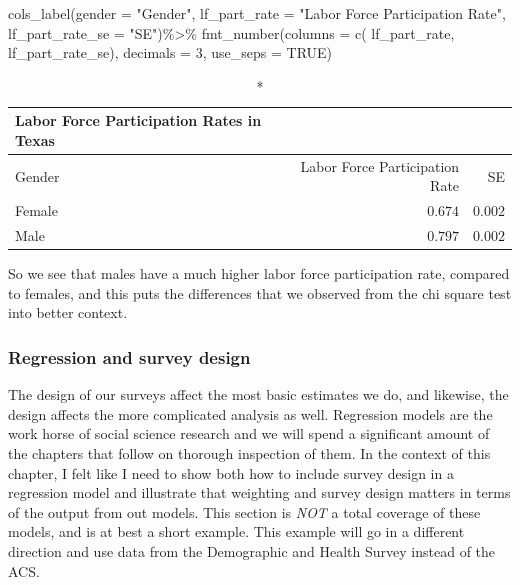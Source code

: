 \documentclass[
]{article}
\newenvironment{Shaded}{\begin{snugshade}}{\end{snugshade}}
\newcommand{\AttributeTok}[1]{\textcolor[rgb]{0.77,0.63,0.00}{#1}}
\newcommand{\ConstantTok}[1]{\textcolor[rgb]{0.00,0.00,0.00}{#1}}
\newcommand{\DecValTok}[1]{\textcolor[rgb]{0.00,0.00,0.81}{#1}}
\newcommand{\FunctionTok}[1]{\textcolor[rgb]{0.00,0.00,0.00}{#1}}
\newcommand{\NormalTok}[1]{#1}
\newcommand{\SpecialCharTok}[1]{\textcolor[rgb]{0.00,0.00,0.00}{#1}}
\newcommand{\StringTok}[1]{\textcolor[rgb]{0.31,0.60,0.02}{#1}}
\begin{document}
\begin{Shaded}
\begin{Highlighting}[]
    \FunctionTok{cols\_label}\NormalTok{(}\AttributeTok{gender =} \StringTok{"Gender"}\NormalTok{,}
                 \AttributeTok{lf\_part\_rate =} \StringTok{"Labor Force Participation Rate"}\NormalTok{,}
                \AttributeTok{lf\_part\_rate\_se =} \StringTok{"SE"}\NormalTok{)}\SpecialCharTok{\%\textgreater{}\%}
    \FunctionTok{fmt\_number}\NormalTok{(}\AttributeTok{columns =} \FunctionTok{c}\NormalTok{( lf\_part\_rate,  lf\_part\_rate\_se), }
                 \AttributeTok{decimals =} \DecValTok{3}\NormalTok{, }\AttributeTok{use\_seps =} \ConstantTok{TRUE}\NormalTok{)}
\end{Highlighting}
\end{Shaded}

\captionsetup[table]{labelformat=empty,skip=1pt}
\begin{longtable}{lrr}
\caption*{
{\large Labor Force Participation Rates in Texas}
} \\ 
\toprule
Gender & Labor Force Participation Rate & SE \\ 
\midrule
Female & $0.674$ & $0.002$ \\ 
Male & $0.797$ & $0.002$ \\ 
 \bottomrule
\end{longtable}

So we see that males have a much higher labor force participation rate, compared to females, and this puts the differences that we observed from the chi square test into better context.

\hypertarget{regression-and-survey-design}{%
\subsubsection{Regression and survey design}\label{regression-and-survey-design}}

The design of our surveys affect the most basic estimates we do, and likewise, the design affects the more complicated analysis as well. Regression models are the work horse of social science research and we will spend a significant amount of the chapters that follow on thorough inspection of them. In the context of this chapter, I felt like I need to show both how to include survey design in a regression model and illustrate that weighting and survey design matters in terms of the output from out models. This section is \emph{NOT} a total coverage of these models, and is at best a short example. This example will go in a different direction and use data from the Demographic and Health Survey instead of the ACS.
\end{document}
